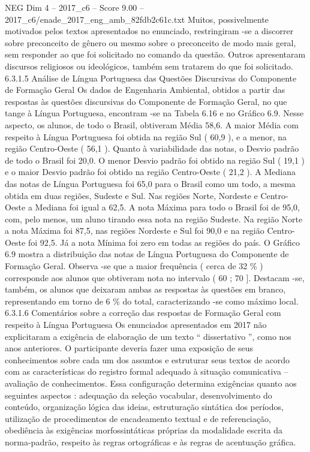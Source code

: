 \begin{textsample}{NEG Dim 4 – 2017\_c6 – Score 9.00 – 2017\_c6/enade\_2017\_eng\_amb\_82fdb2c61c.txt}
Muitos, possivelmente motivados pelos textos apresentados no enunciado, restringiram -se a discorrer sobre preconceito de gênero ou mesmo sobre o preconceito de modo mais geral, sem responder ao que foi solicitado no comando da questão.
Outros apresentaram discursos religiosos ou ideológicos, também sem tratarem do que foi solicitado. 6.3.1.5 Análise de Língua Portuguesa das Questões Discursivas do Componente de Formação Geral Os dados de Engenharia Ambiental, obtidos a partir das respostas às questões discursivas do Componente de Formação Geral, no que tange à Língua Portuguesa, encontram -se na Tabela 6.16 e no Gráfico 6.9.
Nesse aspecto, os alunos, de todo o Brasil, obtiveram Média 58,6.
A maior Média com respeito à Língua Portuguesa foi obtida na região Sul ( 60,9 ), e a menor, na região Centro-Oeste ( 56,1 ).
Quanto à variabilidade das notas, o Desvio padrão de todo o Brasil foi 20,0.
O menor Desvio padrão foi obtido na região Sul ( 19,1 ) e o maior Desvio padrão foi obtido na região Centro-Oeste ( 21,2 ).
A Mediana das notas de Língua Portuguesa foi 65,0 para o Brasil como um todo, a mesma obtida em duas regiões, Sudeste e Sul.
Nas regiões Norte, Nordeste e Centro-Oeste a Mediana foi igual a 62,5.
A nota Máxima para todo o Brasil foi de 95,0, com, pelo menos, um aluno tirando essa nota na região Sudeste.
Na região Norte a nota Máxima foi 87,5, nas regiões Nordeste e Sul foi 90,0 e na região Centro-Oeste foi 92,5.
Já a nota Mínima foi zero em todas as regiões do país.
O Gráfico 6.9 mostra a distribuição das notas de Língua Portuguesa do Componente de Formação Geral.
Observa -se que a maior frequência ( cerca de 32 \% ) corresponde aos alunos que obtiveram nota no intervalo ( 60 ; 70 ].
Destacam -se, também, os alunos que deixaram ambas as respostas às questões em branco, representando em torno de 6 \% do total, caracterizando -se como máximo local. 6.3.1.6 Comentários sobre a correção das respostas de Formação Geral com respeito à Língua Portuguesa Os enunciados apresentados em 2017 não explicitaram a exigência de elaboração de um texto “ dissertativo ”, como nos anos anteriores.
O participante deveria fazer uma exposição de seus conhecimentos sobre cada um dos assuntos e estruturar seus textos de acordo com as características do registro formal adequado à situação comunicativa – avaliação de conhecimentos.
Essa configuração determina exigências quanto aos seguintes aspectos : adequação da seleção vocabular, desenvolvimento do conteúdo, organização lógica das ideias, estruturação sintática dos períodos, utilização de procedimentos de encadeamento textual e de referenciação, obediência às exigências morfossintáticas próprias da modalidade escrita da norma-padrão, respeito às regras ortográficas e às regras de acentuação gráfica.

\end{textsample}
